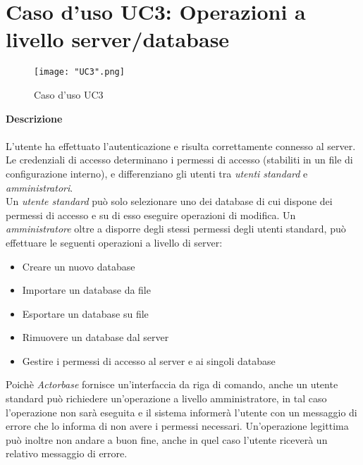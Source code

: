 \documentclass[a4paper]{report}
\begin{document}
	 \section{Caso d'uso UC3: Operazioni a livello server/database}
	 	\begin{figure}[H]
			\centering
			\texttt{[image: "UC3".png]}
			\caption{Caso d'uso UC3}
		\end{figure}
	 \textbf{Descrizione} \\ \\
	 L'utente ha effettuato l'autenticazione e risulta correttamente connesso al server. Le credenziali di
	 accesso determinano i permessi di accesso (stabiliti in un file di configurazione interno), e differenziano
	 gli utenti tra \emph{utenti standard} e \emph{amministratori}. \\
	 Un \emph{utente standard} può solo selezionare uno dei database di cui dispone dei permessi di
	  accesso e su di esso eseguire operazioni di modifica.
	 Un \emph{amministratore} oltre a disporre degli stessi permessi degli utenti standard, può effettuare
	 le seguenti operazioni a livello di server:
	 \begin{itemize}
	 	\item Creare un nuovo database
	 	\item Importare un database da file
	 	\item Esportare un database su file
	 	\item Rimuovere un database dal server
	 	\item Gestire i permessi di accesso al server e ai singoli database
	 \end{itemize}
	 Poichè \emph{Actorbase} fornisce un'interfaccia da riga di comando, anche un utente standard può
	 richiedere un'operazione a livello amministratore, in tal caso l'operazione non sarà eseguita e il 
	 sistema informerà l'utente con un messaggio di errore che lo informa di non avere i permessi 
	 necessari. Un'operazione legittima può inoltre non andare a buon fine, anche in quel caso l'utente 
	 riceverà un relativo messaggio di errore.
\end{document}
